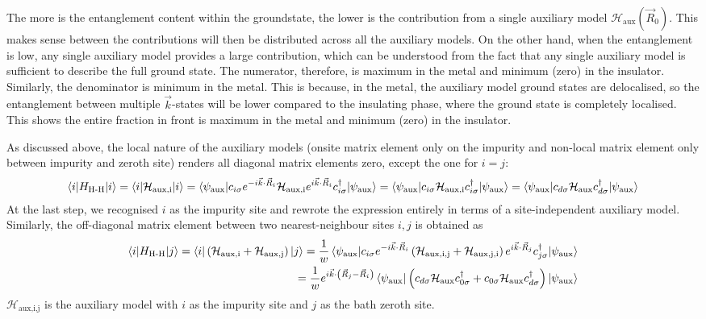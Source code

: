 \documentclass{report}
\numberwithin{equation}{section}
\begin{document}
The more is the entanglement content within the groundstate, the lower is the contribution from a single auxiliary model \(\mathcal{H}_\text{aux}\left( \vec R_0 \right)\). This makes sense between the contributions will then be distributed across all the auxiliary models. On the other hand, when the entanglement is low, any single auxiliary model provides a large contribution, which can be understood from the fact that any single auxiliary model is sufficient to describe the full ground state. The numerator, therefore, is maximum in the metal and minimum (zero) in the insulator. Similarly, the denominator is minimum in the metal. This is because, in the metal, the auxiliary model ground states are delocalised, so the entanglement between multiple \(\vec k\)-states will be lower compared to the insulating phase, where the ground state is completely localised. This shows the entire fraction in front is maximum in the metal and minimum (zero) in the insulator.






\clearpage
As discussed above, the local nature of the auxiliary models (onsite matrix element only on the impurity and non-local matrix element only between impurity and zeroth site) renders all diagonal matrix elements zero, except the one for \(i=j\):
\begin{equation}\begin{aligned}
	\braket{i | H_\text{H-H} | i} = \braket{i | \mathcal{H}_\text{aux,i} | i} = \braket{\psi_\text{aux} | c_{i\sigma} e^{-i \vec{k}\cdot\vec{R}_i} \mathcal{H}_\text{aux,i} e^{i \vec{k}\cdot\vec{R}_i} c^\dagger_{i\sigma} | \psi_\text{aux}} = \braket{\psi_\text{aux} | c_{i\sigma} \mathcal{H}_\text{aux,i} c^\dagger_{i\sigma} | \psi_\text{aux}} = \braket{\psi_\text{aux} | c_{d\sigma} \mathcal{H}_\text{aux} c^\dagger_{d\sigma} | \psi_\text{aux}}
\end{aligned}\end{equation}
At the last step, we recognised \(i\) as the impurity site and rewrote the expression entirely in terms of a site-independent auxiliary model.
Similarly, the off-diagonal matrix element between two nearest-neighbour sites \(i,j\) is obtained as
\begin{equation}\begin{aligned}
	\braket{i | H_\text{H-H} | j} = \braket{i | \left(\mathcal{H}_\text{aux,i} + \mathcal{H}_\text{aux,j}\right) | j} = \frac{1}{w}\braket{\psi_\text{aux} | c_{i\sigma} e^{-i \vec{k}\cdot\vec{R}_i} \left(\mathcal{H}_\text{aux,i,j} + \mathcal{H}_\text{aux,j,i}\right) e^{i \vec{k}\cdot\vec{R}_j} c^\dagger_{j\sigma} | \psi_\text{aux}} \\
	= \frac{1}{w}e^{i \vec{k}\cdot\left(\vec{R}_j - \vec{R}_i\right)}\braket{\psi_\text{aux} | \left(c_{d\sigma}\mathcal{H}_\text{aux} c^\dagger_{0\sigma} + c_{0\sigma}\mathcal{H}_\text{aux} c^\dagger_{d\sigma}\right) | \psi_\text{aux}}
\end{aligned}\end{equation}
\(\mathcal{H}_\text{aux,i,j}\) is the auxiliary model with \(i\) as the impurity site and \(j\) as the bath zeroth site. 
\end{document}
